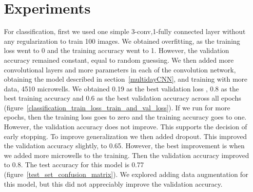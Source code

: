\documentclass[10pt,twocolumn,letterpaper]{article}
\begin{document}
 \section{Experiments}
 
For classification, first we used one simple 3-conv,1-fully connected layer without any regularization to train 100 images.  We obtained overfitting, as the training loss went to 0 and the training accuracy  went to 1. However, the validation accuracy remained constant, equal to random guessing.  We then added more convolutional layers and more parameters in each of the convolution network, obtaining the model described in section~\ref{multidayCNN},  and training with more data, 4510 microwells.  We obtained 0.19 as the best validation loss , 0.8 as the best training accuracy and 0.6 as the best validation accuracy across all epochs (figure~\ref{classification_train_loss_train_and_val_loss}).  If we run for more epochs, then the training loss goes to zero and the training accuracy goes to one.  However, the validation accuracy does not improve.  This supports the decision of early stopping.  To improve generalization we then added dropout.  This improved the validation accuracy slightly, to 0.65.
However, the best improvement is when we added more microwells to the training.  Then the validation accuracy improved to 0.8.  The test accuracy for this model is 0.77 (figure~\ref{test_set_confusion_matrix}).
We explored adding data augmentation for this model, but this did not appreciably improve the validation accuracy.
  
\end{document}
